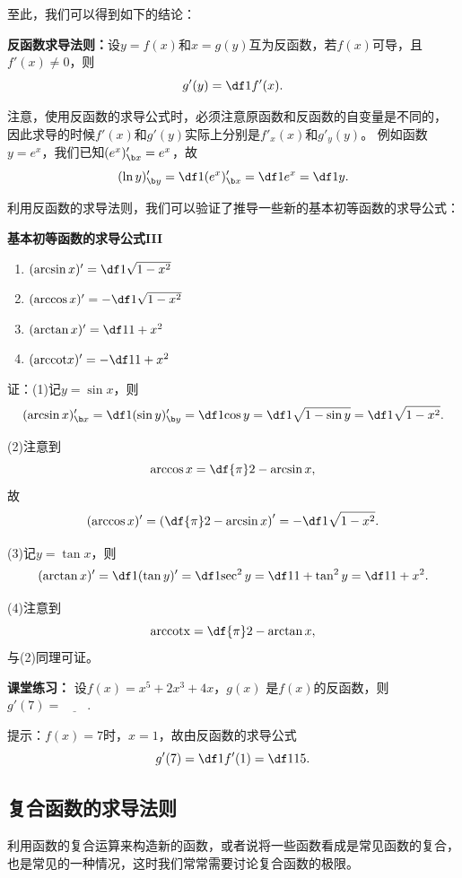 至此，我们可以得到如下的结论：

\begin{thx}
	{\bf 反函数求导法则：}设$y=f(x)$和$x=g(y)$互为反函数，若$f(x)$可导，且$f'(x)\ne 0$，则
	$$g'(y)=\df1{f'(x)}.$$
\end{thx}
注意，{\baa 使用反函数的求导公式时，必须注意原函数和反函数的自变量是不同的，
因此求导的时候$f'(x)$和$g'(y)$实际上分别是$f'_x(x)$和$g'_y(y)$。}
例如函数$y=e^x$，我们已知$(e^x)'_{\b x}=e^x$，故
$$(\ln y)'_{\b y}=\df1{(e^x)'_{\b x}}=\df1{e^x}=\df1y.$$

\bs
利用反函数的求导法则，我们可以验证了推导一些新的基本初等函数的求导公式：
\begin{thx}
	{\bf 基本初等函数的求导公式III}
	\begin{enumerate}[(1)]
		\item $(\arcsin x)'=\df1{\sqrt{1-x^2}}$
		\item $(\arccos x)'=-\df1{\sqrt{1-x^2}}$
		\item $(\arctan x)'=\df1{1+x^2}$
		\item $(\mathrm{arccot}x)'=-\df1{1+x^2}$
	\end{enumerate}
\end{thx}

证：(1)记$y=\sin x$，则
$$(\arcsin x)'_{\b x}=\df1{(\sin y)'_{\b y}}=\df1{\cos y}
=\df1{\sqrt{1-\sin y}}=\df1{\sqrt{1-x^2}}.$$

(2)注意到
$$\arccos x=\df{\pi}2-\arcsin x,$$
故
$$(\arccos x)'=\left(\df{\pi}2-\arcsin x\right)'
=-\df1{\sqrt{1-x^2}}.$$

(3)记$y=\tan x$，则
$$(\arctan x)'=\df1{(\tan y)'}=\df1{\sec^2y}
=\df1{1+\tan^2y}=\df1{1+x^2}.$$

(4)注意到
$$\mathrm{arccot x}=\df{\pi}2-\arctan x,$$
与(2)同理可证。
\fin

\bs
{\bf 课堂练习：} 设$f(x)=x^5+2x^3+4x$，$g(x)$
是$f(x)$的反函数，则$g'(7)=\underline{\quad\quad}$.

\ifhint
提示：$f(x)=7$时，$x=1$，故由反函数的求导公式
$$g'(7)=\df1{f'(1)}=\df1{15}.$$
\fi

\subsection{复合函数的求导法则}

利用函数的复合运算来构造新的函数，或者说将一些函数看成是常见函数的复合，
也是常见的一种情况，这时我们常常需要讨论复合函数的极限。

